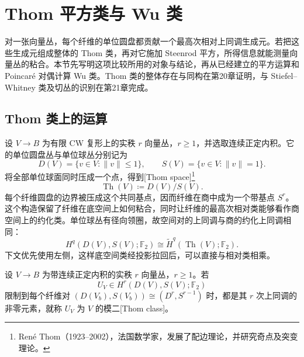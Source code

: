 
% 
% 
% 
% 

\section{Thom 平方类与 Wu 类}
\label{g2:sec:1304}

对一张向量丛，每个纤维的单位圆盘都贡献一个最高次相对上同调生成元。若把这些生成元组成整体的 Thom 类，再对它施加 Steenrod 平方，所得信息就能测量向量丛的粘合。本节先写明这项比较所用的对象与结论，再从已经建立的平方运算和 Poincaré 对偶计算 Wu 类。Thom 类的整体存在与同构在第20章证明，与 Stiefel--Whitney 类及切丛的识别在第21章完成。

\subsection{Thom 类上的运算}
\label{g2:subsec:1304:01}

设 \(V\to B\) 为有限 CW 复形上的实秩 \(r\) 向量丛，\(r\ge1\)，并选取连续正定内积。它的单位圆盘丛与单位球丛分别记为
\[
	D(V)=\{v\in V:\|v\|\le1\},\qquad S(V)=\{v\in V:\|v\|=1\}.
\]
将全部单位球面同时压成一个点，得到[Thom space]\footnote{René Thom（1923--2002），法国数学家，发展了配边理论，并研究奇点及突变理论。}
\[
	\operatorname{Th}(V)\coloneqq D(V)/S(V).
\]
每个纤维圆盘的边界被压成这个共同基点，因而纤维在商中成为一个带基点 \(S^r\)。这个构造保留了纤维在底空间上如何粘合，同时让纤维的最高次相对类能够看作商空间上的约化类。单位球丛有径向领圈，故空间对的上同调与商的约化上同调相同：
\[
	H^q(D(V),S(V);\mathbb F_2)\cong\widetilde H^q(\operatorname{Th}(V);\mathbb F_2).
\]
下文优先使用左侧，这样底空间类经投影拉回后，可以直接与相对类相乘。

\begin{definition}[模二 Thom 类]\label{g2:def:mod-two-thom-class}
	设 \(V\to B\) 为带连续正定内积的实秩 \(r\) 向量丛，\(r\ge1\)。若
	\[
		U_V\in H^r(D(V),S(V);\mathbb F_2)
	\]
	限制到每个纤维对 \((D(V_b),S(V_b))\cong(D^r,S^{r-1})\) 时，都是其 \(r\) 次上同调的非零元素，就称 \(U_V\) 为 \(V\) 的模二[Thom class]。
\end{definition}

